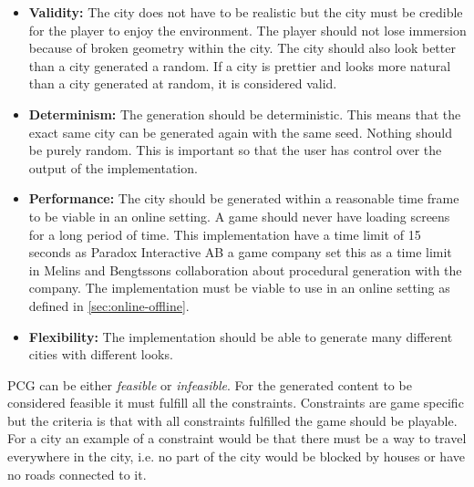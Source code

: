 \begin{itemize}
	\item \textbf{Validity:} The city does not have to be realistic but the city must be credible for the player to enjoy the environment. The player should not lose immersion because of broken geometry within the city. The city should also look better than a city generated a random. If a city is prettier and looks more natural than a city generated at random, it is considered valid.
		
	\item \textbf{Determinism:} The generation should be deterministic. This means that the exact same city can be generated again with the same seed. Nothing should be purely random. This is important so that the user has control over the output of the implementation.
		
	\item \textbf{Performance:} The city should be generated within a reasonable time frame to be viable in an online setting. A game should never have loading screens for a long period of time. This implementation have a time limit of 15 seconds as Paradox Interactive AB a game company set this as a time limit in Melins and Bengtssons collaboration about procedural generation with the company\cite{FloorPlanPCG}. The implementation must be viable to use in an online setting as defined in \ref{sec:online-offline}.
		
	\item \textbf{Flexibility: } The implementation should be able to generate many different cities with different looks.
\end{itemize} 

PCG can be either \textit{feasible} or \textit{infeasible}. For the generated content to be considered feasible it must fulfill all the constraints\cite{NoveltySearch}. Constraints are game specific but the criteria is that with all constraints fulfilled the game should be playable. For a city an example of a constraint would be that there must be a way to travel everywhere in the city, i.e. no part of the city would be blocked by houses or have no roads connected to it.